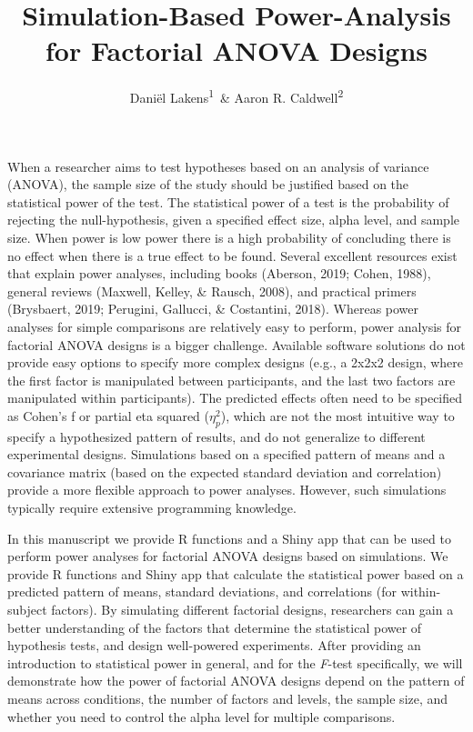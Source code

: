 \documentclass[,jou, draftfirst, a4paper,floatsintext]{apa6}
\title{Simulation-Based Power-Analysis for Factorial ANOVA Designs}
\author{Daniël Lakens\textsuperscript{1}~\& Aaron R. Caldwell\textsuperscript{2}}
\date{}
\affiliation{
\vspace{0.5cm}
\textsuperscript{1} Eindhoven University of Technology, The Netherlands\\\textsuperscript{2} Department of Health, Human Performance and Recreation, University of Arkansas, USA}
\begin{document}
\maketitle

When a researcher aims to test hypotheses based on an analysis of variance (ANOVA), the sample size of the study should be justified based on the statistical power of the test.
The statistical power of a test is the probability of rejecting the null-hypothesis, given a specified effect size, alpha level, and sample size.
When power is low power there is a high probability of concluding there is no effect when there is a true effect to be found.
Several excellent resources exist that explain power analyses, including books (Aberson, 2019; Cohen, 1988), general reviews (Maxwell, Kelley, \& Rausch, 2008), and practical primers (Brysbaert, 2019; Perugini, Gallucci, \& Costantini, 2018).
Whereas power analyses for simple comparisons are relatively easy to perform, power analysis for factorial ANOVA designs is a bigger challenge.
Available software solutions do not provide easy options to specify more complex designs (e.g., a 2x2x2 design, where the first factor is manipulated between participants, and the last two factors are manipulated within participants).
The predicted effects often need to be specified as Cohen's f or partial eta squared (\(\eta_p^2\)), which are not the most intuitive way to specify a hypothesized pattern of results, and do not generalize to different experimental designs.
Simulations based on a specified pattern of means and a covariance matrix (based on the expected standard deviation and correlation) provide a more flexible approach to power analyses.
However, such simulations typically require extensive programming knowledge.

In this manuscript we provide R functions and a Shiny app that can be used to perform power analyses for factorial ANOVA designs based on simulations.
We provide R functions and Shiny app that calculate the statistical power based on a predicted pattern of means, standard deviations, and correlations (for within-subject factors).
By simulating different factorial designs, researchers can gain a better understanding of the factors that determine the statistical power of hypothesis tests, and design well-powered experiments.
After providing an introduction to statistical power in general, and for the \emph{F}-test specifically, we will demonstrate how the power of factorial ANOVA designs depend on the pattern of means across conditions, the number of factors and levels, the sample size, and whether you need to control the alpha level for multiple comparisons.
\end{document}
